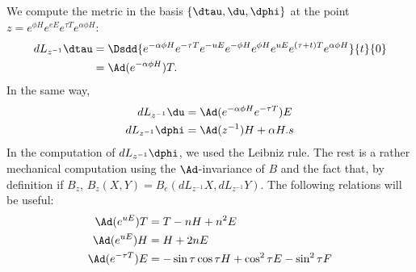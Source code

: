 We compute the metric in the basis $\{\dtau,\du,\dphi\}$ at the point $z=e^{\phi H}e^{eE}e^{\tau T}e^{\alpha\phi H}$:
\begin{equation}
	\begin{aligned}[]
		dL_{z^{-1}}\dtau & =\Dsdd{  e^{-\alpha\phi H}e^{-\tau T}e^{-uE}e^{-\phi H}e^{\phi H}e^{uE}e^{(\tau+t)T}e^{\alpha\phi H}  }{t}{0} \\
		                 & =\Ad(e^{-\alpha\phi H})T.
	\end{aligned}
\end{equation}
In the same way,
\begin{equation}
	\begin{aligned}[]
		dL_{z^{-1}}\du   & =\Ad(e^{-\alpha\phi H}e^{-\tau T})E \\
		dL_{z^{-1}}\dphi & =\Ad(z^{-1})H+\alpha H.s
	\end{aligned}
\end{equation}
In the computation of $dL_{z^{-1}}\dphi$, we used the Leibniz rule. The rest is a rather mechanical computation using the $\Ad$-invariance of $B$ and the fact that, by definition if $B_z$, $B_z(X,Y)=B_e(dL_{z^{-1}}X,dL_{z^{-1}}Y)$. The following relations will be useful:
\begin{subequations}
	\begin{align}
		\Ad(e^{uE})T      & =T-nH+n^2E                                     \\
		\Ad(e^{uE})H      & =H+2nE                                         \\
		\Ad(e^{-\tau T})E & =-\sin\tau\cos\tau H+\cos^2\tau E-\sin^2\tau F
	\end{align}
\end{subequations}
